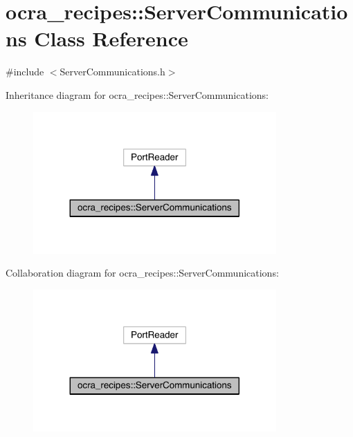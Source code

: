 \hypertarget{classocra__recipes_1_1ServerCommunications}{}\section{ocra\+\_\+recipes\+:\+:Server\+Communications Class Reference}
\label{classocra__recipes_1_1ServerCommunications}


{\ttfamily \#include $<$Server\+Communications.\+h$>$}



Inheritance diagram for ocra\+\_\+recipes\+:\+:Server\+Communications\+:\nopagebreak
\begin{figure}[H]
\begin{center}
\leavevmode
\includegraphics[width=263pt]{d5/d38/classocra__recipes_1_1ServerCommunications__inherit__graph}
\end{center}
\end{figure}


Collaboration diagram for ocra\+\_\+recipes\+:\+:Server\+Communications\+:\nopagebreak
\begin{figure}[H]
\begin{center}
\leavevmode
\includegraphics[width=263pt]{d6/d4b/classocra__recipes_1_1ServerCommunications__coll__graph}
\end{center}
\end{figure}
